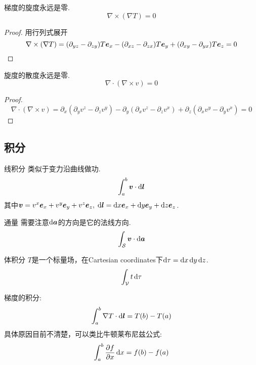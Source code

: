 \documentclass{mynote}
\begin{document}
\begin{proposition}
    梯度的旋度永远是零.
    \[
    \nabla \times (\nabla T) = 0    
    \]
\end{proposition}
\begin{proof}
    用行列式展开
    \[
    \nabla \times (\nabla T) = (\partial_{yz} - \partial_{zy})T\boldsymbol{e}_x -(\partial_{xz} - \partial_{zx})T\boldsymbol{e}_y + (\partial_{xy} - \partial_{yx})T\boldsymbol{e}_z = 0
    \]
\end{proof}



\begin{proposition}
    旋度的散度永远是零.
    \[
    \nabla \cdot (\nabla \times v) = 0    
    \]
\end{proposition}
\begin{proof}
    \[
    \nabla\cdot (\nabla \times v) = \partial_x(\partial_y v^z - \partial_z v^y) - \partial_y(\partial_x v^z - \partial_z v^x) + \partial_z(\partial_x v^y - \partial_y v^x) = 0        
    \]
\end{proof}



\subsection{积分}
\begin{define}{线积分}
    类似于变力沿曲线做功.
    \[
    \int_a^b \boldsymbol{v} \cdot \mathop{}\!\mathrm{d} \boldsymbol{l}    
    \]
    其中$\boldsymbol{v}=v^x \boldsymbol{e}_x + v^y \boldsymbol{e}_y + v^z\boldsymbol{e}_z,\; \mathop{}\!\mathrm{d} \boldsymbol{l} = \mathop{}\!\mathrm{d} x \boldsymbol{e}_x + \mathop{}\!\mathrm{d} y \boldsymbol{e}_y + \mathop{}\!\mathrm{d} z \boldsymbol{e}_z$.
\end{define}

\begin{define}{通量}
    需要注意$\mathop{}\!\mathrm{d} \boldsymbol{a}$的方向是它的法线方向.
    \[
    \int_{\mathcal{S}} \boldsymbol{v} \cdot \mathop{}\!\mathrm{d} \boldsymbol{a}
    \]
\end{define}


\begin{define}{体积分}
    $T$是一个标量场，在Cartesian coordinates下$\mathop{}\!\mathrm{d} \tau  = \mathop{}\!\mathrm{d} x \mathop{}\!\mathrm{d} y \mathop{}\!\mathrm{d} z$.
    \[
    \int_{\mathcal{V}} t \mathop{}\!\mathrm{d} \tau    
    \]
\end{define}


\begin{proposition}
    梯度的积分:
    \[
    \int_a^b \nabla T \cdot \mathop{}\!\mathrm{d} \boldsymbol{l} = T(b) - T(a)    
    \]
    具体原因目前不清楚，可以类比牛顿莱布尼兹公式:
    \[
    \int_a^b \dfrac{\partial f}{\partial x} \mathop{}\!\mathrm{d} x = f(b) - f(a)    
    \]
\end{proposition}
\end{document}
